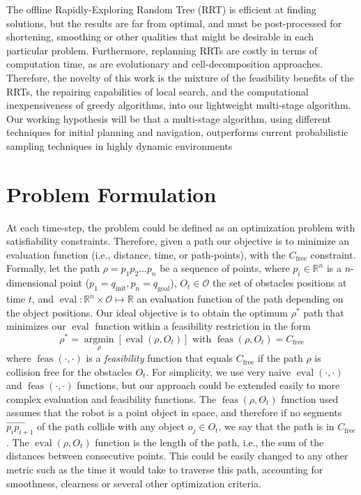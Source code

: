 The offline Rapidly-Exploring Random Tree (RRT) is efficient at finding solutions, but the results are far from
optimal, and must be post-processed for shortening, smoothing or other qualities
that might be desirable in each particular problem. Furthermore, replanning RRTs
are costly in terms of computation time, as are evolutionary and cell-decomposition
approaches. Therefore, the novelty of this work is
the mixture of the feasibility benefits of the RRTs, the repairing capabilities
of local search, and the computational inexpensiveness of greedy algorithms,
into our lightweight multi-stage algorithm. Our working hypothesis will be that
a multi-stage algorithm, using different techniques for initial planning and
navigation,
outperforms current probabilistic sampling techniques in highly dynamic
environments

\section{Problem Formulation}

At each time-step, the problem could be defined as
an optimization problem with satisfiability constraints.
Therefore, given a path our objective is to minimize an evaluation function
(i.e., distance, time, or path-points), with the \(C_{\text{free}}\) constraint.
Formally, let the path \mbox{$\rho=p_1p_2\ldots p_n$} be a sequence of points, where
\mbox{$p_i \in \mathbb{R}^n$} is a $n$-dimensional point (\mbox{\(p_1 = q_{\text{init}}, p_n =
q_{\text{goal}}\)}),
$O_t\in \mathcal{O} $ the set of obstacles positions
at time $t$, and \mbox{$\operatorname{eval} \colon \mathbb{R}^n \times
\mathcal{O} \mapsto \mathbb{R}$}
an evaluation function of the path depending on the object positions.
Our ideal objective is to obtain the optimum $\rho^*$ path that
minimizes our $\operatorname{eval}$ function within a feasibility restriction in the form
\begin{equation}
\displaystyle\rho^*=\underset{\rho}{\operatorname{argmin}}[\operatorname{eval}(\rho,O_t)]  \textrm{ with }
\operatorname{feas}(\rho,O_t) = C_{\text{free}}
\label{eq:problem}
\end{equation}
where \(\operatorname{feas}(\cdot,\cdot)\) is a \emph{feasibility} function that equals
\(C_{\text{free}}\)
if the path $\rho$ is collision free for the obstacles $O_t$.
For simplicity, we use very naive \(\operatorname{eval}(\cdot,\cdot)\) and
\(\operatorname{feas}(\cdot,\cdot)\)
functions, but our approach could be extended easily to more complex evaluation and
feasibility functions.
The \(\operatorname{feas}(\rho,O_t)\) function used assumes that the robot is a point
object in space, and therefore if no segments
\(\overrightarrow{p_i p_{i+1}}\)
of the path collide with any object \(o_j \in O_t\), we say that the path
is in \(C_{\text{free}}\).
The \(\operatorname{eval}(\rho,O_t)\) function is the length of the path, i.e., the sum of the distances between
consecutive points. This could be easily changed to any other metric such as the time
it would take to traverse this path, accounting for smoothness,
clearness or several other optimization criteria.

